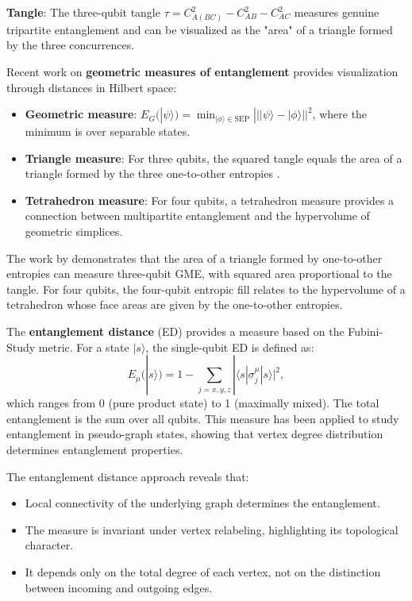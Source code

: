 \documentclass[12pt,a4paper]{article}
\begin{document}
\textbf{Tangle}: The three-qubit tangle $\tau = C_{A(BC)}^2 - C_{AB}^2 - C_{AC}^2$ measures genuine tripartite entanglement and can be visualized as the "area" of a triangle formed by the three concurrences.

Recent work on \textbf{geometric measures of entanglement} provides visualization through distances in Hilbert space:
\begin{itemize}
	\item \textbf{Geometric measure}: $E_G(|\psi\rangle) = \min_{|\phi\rangle \in \text{SEP}} |||\psi\rangle - |\phi\rangle||^2$, where the minimum is over separable states.
	\item \textbf{Triangle measure}: For three qubits, the squared tangle equals the area of a triangle formed by the three one-to-other entropies \cite{Xie2024}.
	\item \textbf{Tetrahedron measure}: For four qubits, a tetrahedron measure provides a connection between multipartite entanglement and the hypervolume of geometric simplices.
\end{itemize}

The work by \cite{Xie2024} demonstrates that the area of a triangle formed by one-to-other entropies can measure three-qubit GME, with squared area proportional to the tangle. For four qubits, the four-qubit entropic fill relates to the hypervolume of a tetrahedron whose face areas are given by the one-to-other entropies.

The \textbf{entanglement distance} (ED) \cite{EntanglementDistance} provides a measure based on the Fubini-Study metric. For a state $|s\rangle$, the single-qubit ED is defined as:
\begin{equation}
	E_\mu(|s\rangle) = 1 - \sum_{j=x,y,z} |\langle s|\sigma_j^\mu|s\rangle|^2,
\end{equation}
which ranges from 0 (pure product state) to 1 (maximally mixed). The total entanglement is the sum over all qubits. This measure has been applied to study entanglement in pseudo-graph states, showing that vertex degree distribution determines entanglement properties.

The entanglement distance approach reveals that:
\begin{itemize}
	\item Local connectivity of the underlying graph determines the entanglement.
	\item The measure is invariant under vertex relabeling, highlighting its topological character.
	\item It depends only on the total degree of each vertex, not on the distinction between incoming and outgoing edges.
\end{itemize}
\end{document}
